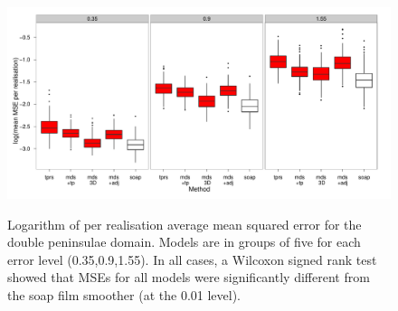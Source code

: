 
\begin{figure}
\centering
\includegraphics[width=\textwidth]{mds/figs/big-mds-wt2-boxplot.pdf} \\
\caption{Logarithm of per realisation average mean squared error for the double peninsulae domain. Models are in groups of five for each error level (0.35,0.9,1.55). In all cases, a Wilcoxon signed rank test showed that MSEs for all models were significantly different from the soap film smoother (at the 0.01 level).}
\label{big-wt2-mses}
\end{figure}

